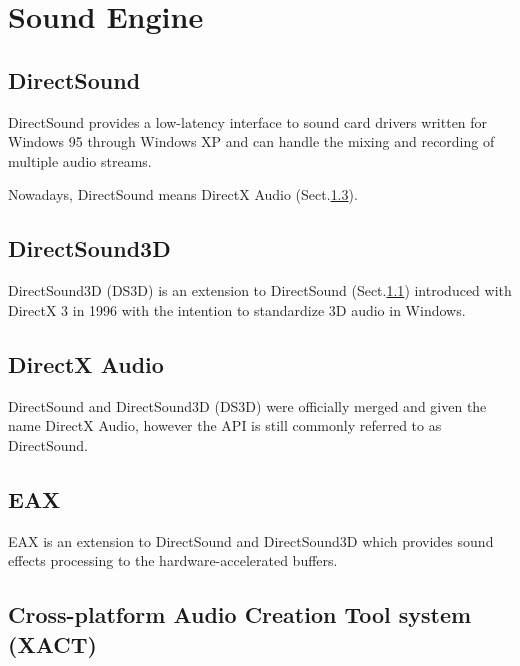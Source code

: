 \chapter{Sound Engine}
\label{chap:SoundEngine}


\section{DirectSound}
\label{sec:DirectSound}


DirectSound provides a low-latency interface to sound card drivers written for
Windows 95 through Windows XP and can handle the mixing and recording of
multiple audio streams.

Nowadays, DirectSound means DirectX Audio (Sect.\ref{sec:DirectX_Audio}).

\section{DirectSound3D}
\label{sec:DirectSound3D}

DirectSound3D (DS3D) is an extension to DirectSound (Sect.\ref{sec:DirectSound})
introduced with DirectX 3 in 1996 with the intention to standardize 3D audio in
Windows.


\section{DirectX Audio}
\label{sec:DirectX_Audio}

DirectSound and DirectSound3D (DS3D) were officially merged and given the name
DirectX Audio, however the API is still commonly referred to as DirectSound.

\section{EAX}
\label{sec:EAX}

EAX is an extension to DirectSound and DirectSound3D which provides sound
effects processing to the hardware-accelerated buffers.

\section{Cross-platform Audio Creation Tool system (XACT)}
\label{sec:XACT}

